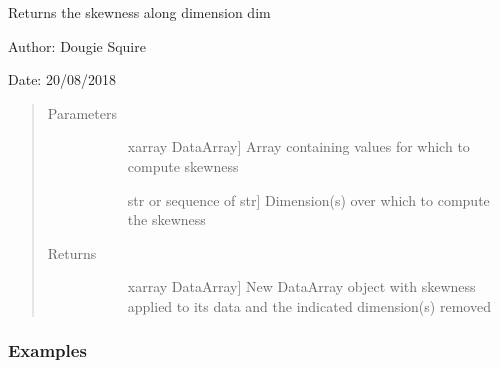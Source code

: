 \documentclass[letterpaper,10pt,english]{sphinxmanual}
\begin{document}

\begin{fulllineitems}
\label{\detokenize{utils_doc:utils.skewness}}
Returns the skewness along dimension dim

\begin{DUlineblock}{0em}
\item[] Author: Dougie Squire
\item[] Date: 20/08/2018
\end{DUlineblock}
\begin{quote}\begin{description}
\item[{Parameters}] \leavevmode\begin{description}
\item[{}] \leavevmode{[}xarray DataArray{]}
Array containing values for which to compute skewness

\item[{}] \leavevmode{[}str or sequence of str{]}
Dimension(s) over which to compute the skewness

\end{description}

\item[{Returns}] \leavevmode\begin{description}
\item[{}] \leavevmode{[}xarray DataArray{]}
New DataArray object with skewness applied to its data and the indicated dimension(s) removed

\end{description}

\end{description}\end{quote}
\subsubsection*{Examples}


\end{fulllineitems}
\end{document}
